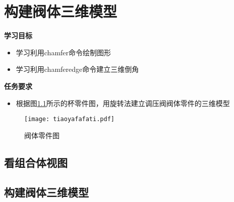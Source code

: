 \chapter{构建阀体三维模型}

{\bfseries 学习目标}
\begin{itemize}
\item 学习利用chamfer命令绘制图形
\item 学习利用chamferedge命令建立三维倒角
\end{itemize}

{\bfseries 任务要求}
\begin{itemize}
\item 根据图\ref{fig:tiaoyafafati}所示的杯零件图，用旋转法建立调压阀阀体零件的三维模型
\end{itemize}

\noindent
\begin{figure}[htbp]
\centering
\texttt{[image: tiaoyafafati.pdf]}
\caption{阀体零件图}\label{fig:tiaoyafafati}
\end{figure}
\clearpage
\section{看组合体视图}


%
\section{构建阀体三维模型}


\endinput
